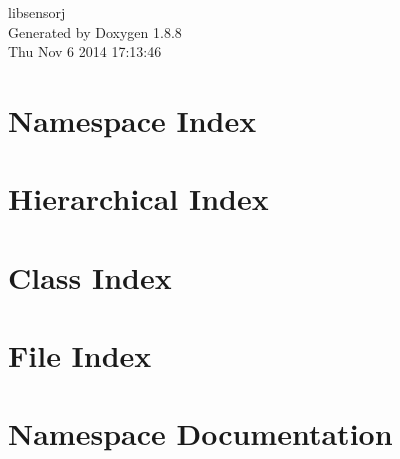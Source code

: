 \documentclass[twoside]{book}
\newcommand{\+}{\discretionary{\mbox{\scriptsize$\hookleftarrow$}}{}{}}
\newcommand{\clearemptydoublepage}{%
  \newpage{\pagestyle{empty}\cleardoublepage}%
}
\begin{document}
\hypersetup{pageanchor=false,
             bookmarks=true,
             bookmarksnumbered=true,
             pdfencoding=unicode
            }
\begin{titlepage}
\vspace*{7cm}
\begin{center}%
{\Large libsensorj }\\
\vspace*{1cm}
{\large Generated by Doxygen 1.8.8}\\
\vspace*{0.5cm}
{\small Thu Nov 6 2014 17:13:46}\\
\end{center}
\end{titlepage}
\clearemptydoublepage
\tableofcontents
\clearemptydoublepage
{}
\hypersetup{pageanchor=true}

\chapter{Namespace Index}

\chapter{Hierarchical Index}

\chapter{Class Index}

\chapter{File Index}

\chapter{Namespace Documentation}










\end{document}
